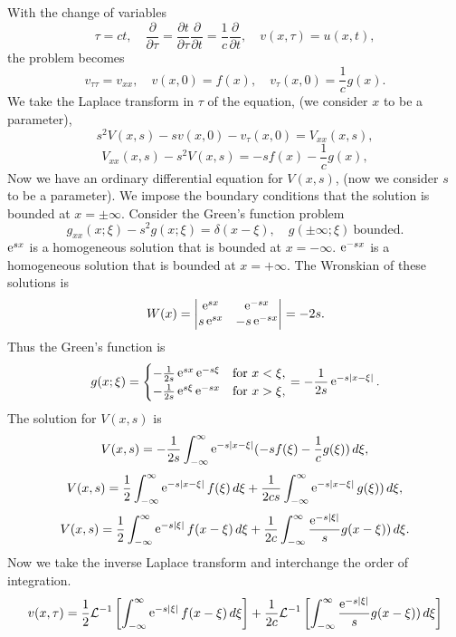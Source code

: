 {\begin{Solution}
  With the change of variables
  \[
  \tau = c t, \quad 
  \frac{\partial}{\partial \tau} = \frac{\partial t}{\partial \tau} \frac{\partial}{\partial t} = \frac{1}{c} \frac{\partial}{\partial t},
  \quad v(x,\tau) = u(x,t),
  \]
  the problem becomes
  \[
  v_{\tau\tau} =  v_{xx}, \quad v(x,0) = f(x), 
  \quad v_\tau(x,0) = \frac{1}{c} g(x).
  \]
  We take the Laplace transform in $\tau$ of the equation,
  (we consider $x$ to be a parameter),
  \[
  s^2 V(x,s) - s v(x,0) - v_\tau(x,0) = V_{xx}(x,s),
  \]
  \[
  V_{xx}(x,s) - s^2 V(x,s) = - s f(x) - \frac{1}{c} g(x),
  \]
  Now we have an ordinary differential equation for $V(x,s)$, 
  (now we consider $s$ to be a parameter).  We impose the boundary conditions
  that the solution is bounded at $x=\pm \infty$.  Consider the Green's 
  function problem
  \[
  g_{xx}(x;\xi) -s^2 g(x;\xi) = \delta(x-\xi), \quad
  g(\pm \infty;\xi)\ \mathrm{bounded}.
  \]
  $\mathop{\mathrm{e}}\nolimits^{s x}$ is a homogeneous solution that is bounded at $x=-\infty$.
  $\mathop{\mathrm{e}}\nolimits^{-s x}$ is a homogeneous solution that is bounded at $x=+\infty$.
  The Wronskian of these solutions is 
  \[
  W(x) = 
  \begin{vmatrix}
    \mathop{\mathrm{e}}\nolimits^{s x} & \mathop{\mathrm{e}}\nolimits^{-s x} \\
    s \mathop{\mathrm{e}}\nolimits^{s x} & -s \mathop{\mathrm{e}}\nolimits^{-s x}
  \end{vmatrix}
  = -2s.
  \]
  Thus the Green's function is
  \[
  g(x;\xi)=
  \begin{cases}
    -\frac{1}{2s} \mathop{\mathrm{e}}\nolimits^{s x} \mathop{\mathrm{e}}\nolimits^{-s \xi} &\mathrm{for}\ x<\xi, \\
    -\frac{1}{2s} \mathop{\mathrm{e}}\nolimits^{s \xi} \mathop{\mathrm{e}}\nolimits^{-s x} &\mathrm{for}\ x>\xi, 
  \end{cases}
  = -\frac{1}{2s} \mathop{\mathrm{e}}\nolimits^{-s|x-\xi|}.
  \]
  The solution for $V(x,s)$ is
  \[
  V(x,s) = -\frac{1}{2s} \int_{-\infty}^\infty \mathop{\mathrm{e}}\nolimits^{-s|x-\xi|} 
  (-s f(\xi) - \frac{1}{c} g(\xi)) \,d\xi,
  \]
  \[
  V(x,s) = \frac{1}{2} \int_{-\infty}^\infty \mathop{\mathrm{e}}\nolimits^{-s|x-\xi|} f(\xi) \,d\xi +
  \frac{1}{2c s} \int_{-\infty}^\infty \mathop{\mathrm{e}}\nolimits^{-s|x-\xi|} g(\xi)) \,d\xi,
  \]
  \[
  V(x,s) = \frac{1}{2} \int_{-\infty}^\infty \mathop{\mathrm{e}}\nolimits^{-s|\xi|} f(x-\xi) \,d\xi +
  \frac{1}{2c} \int_{-\infty}^\infty \frac{\mathop{\mathrm{e}}\nolimits^{-s|\xi|}}{s} g(x-\xi)) \,d\xi.
  \]
  Now we take the inverse Laplace transform and interchange the order of 
  integration.
  \[
  v(x,\tau) = \frac{1}{2} \mathcal{L}^{-1}\left[ 
    \int_{-\infty}^\infty \mathop{\mathrm{e}}\nolimits^{-s|\xi|} f(x-\xi) \,d\xi \right] +
  \frac{1}{2c} \mathcal{L}^{-1}\left[ 
    \int_{-\infty}^\infty \frac{\mathop{\mathrm{e}}\nolimits^{-s|\xi|}}{s} g(x-\xi)) \,d\xi \right]
\]
\end{Solution}}
